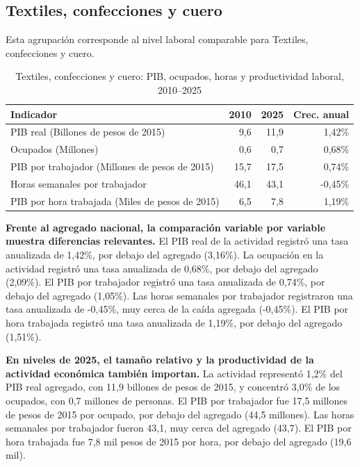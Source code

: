 \subsection{Textiles, confecciones y cuero}

Esta agrupación corresponde al nivel laboral comparable para Textiles, confecciones y cuero.

\begin{table}[H]
\centering
\caption{Textiles, confecciones y cuero: PIB, ocupados, horas y productividad laboral, 2010--2025}
\label{tab:agg25_c02_productividad}
\small
\begin{tabular}{lrrr}
\toprule
Indicador & 2010 & 2025 & Crec. anual \\
\midrule
PIB real  (Billones de pesos de 2015) & 9,6 & 11,9 & 1,42\% \\
Ocupados (Millones) & 0,6 & 0,7 & 0,68\% \\
PIB por trabajador (Millones de pesos de 2015) & 15,7 & 17,5 & 0,74\% \\
Horas semanales por trabajador & 46,1 & 43,1 & -0,45\% \\
PIB por hora trabajada (Miles de pesos de 2015) & 6,5 & 7,8 & 1,19\% \\
\bottomrule
\end{tabular}
\end{table}

\textbf{Frente al agregado nacional, la comparación variable por variable muestra diferencias relevantes.} El PIB real de la actividad registró una tasa anualizada de 1,42\%, por debajo del agregado (3,16\%). La ocupación en la actividad registró una tasa anualizada de 0,68\%, por debajo del agregado (2,09\%). El PIB por trabajador registró una tasa anualizada de 0,74\%, por debajo del agregado (1,05\%). Las horas semanales por trabajador registraron una tasa anualizada de -0,45\%, muy cerca de la caída agregada (-0,45\%). El PIB por hora trabajada registró una tasa anualizada de 1,19\%, por debajo del agregado (1,51\%).

\textbf{En niveles de 2025, el tamaño relativo y la productividad de la actividad económica también importan.} La actividad representó 1,2\% del PIB real agregado, con 11,9 billones de pesos de 2015, y concentró 3,0\% de los ocupados, con 0,7 millones de personas. El PIB por trabajador fue 17,5 millones de pesos de 2015 por ocupado, por debajo del agregado (44,5 millones). Las horas semanales por trabajador fueron 43,1, muy cerca del agregado (43,7). El PIB por hora trabajada fue 7,8 mil pesos de 2015 por hora, por debajo del agregado (19,6 mil).

